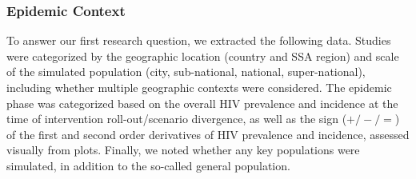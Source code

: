 \subsubsection{Epidemic Context}
\label{sss:meth:context}
To answer our first research question, we extracted the following data.
Studies were categorized by the geographic location (country and SSA region)
and scale of the simulated population (city, sub-national, national, super-national),
including whether multiple geographic contexts were considered.
The epidemic phase was categorized based on
the overall HIV prevalence and incidence at the time of
intervention roll-out/scenario divergence,
as well as the sign ($+/-/=$) of the first and second order derivatives of
HIV prevalence and incidence, assessed visually from plots.
Finally, we noted whether any key populations were simulated,
in addition to the so-called general population.
